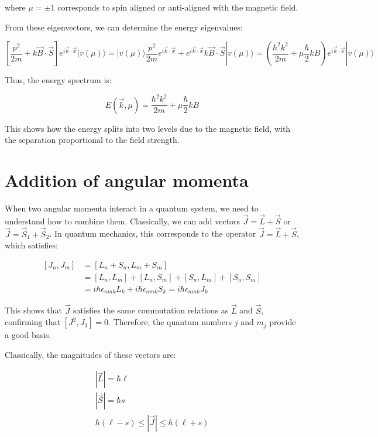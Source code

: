 where $\mu = \pm 1$ corresponds to spin aligned or anti-aligned with the magnetic field.


From these eigenvectors, we can determine the energy eigenvalues:

\begin{equation}
\left[\frac{p^{2}}{2 m}+k \vec{B} \cdot \vec{S}\right] e^{i \vec{k} \cdot \vec{x}}|v(\mu)\rangle=|v(\mu)\rangle \frac{p^{2}}{2 m} e^{i \vec{k} \cdot \vec{x}}+e^{i \vec{k} \cdot \vec{x}} k \vec{B} \cdot \vec{S}|v(\mu)\rangle=\left(\frac{\hbar^{2} k^{2}}{2 m}+\mu \frac{\hbar}{2} k B\right) e^{i \vec{k} \cdot \vec{x}}|v(\mu)\rangle
\end{equation}

Thus, the energy spectrum is:

\begin{equation}
E(\vec{k}, \mu)=\frac{\hbar^{2} k^{2}}{2 m}+\mu \frac{\hbar}{2} k B
\end{equation}

This shows how the energy splits into two levels due to the magnetic field, with the separation proportional to the field strength.

\section{Addition of angular momenta}
When two angular momenta interact in a quantum system, we need to understand how to combine them. Classically, we can add vectors $\vec{J}=\vec{L}+\vec{S}$ or $\vec{J}=\vec{S}_1+\vec{S}_2$. In quantum mechanics, this corresponds to the operator $\vec{J}=\vec{L}+\vec{S}$, which satisfies:

\begin{align}
\left[J_{n}, J_{m}\right] &= \left[L_{n}+S_{n}, L_{m}+S_{m}\right]\\
&= \left[L_{n}, L_{m}\right]+\left[L_{n}, S_{m}\right]+\left[S_{n}, L_{m}\right]+\left[S_{n}, S_{m}\right]\\
&= i \hbar \epsilon_{n m k} L_{k}+i \hbar \epsilon_{n m k} S_{k}=i \hbar \epsilon_{n m k} J_{k}
\end{align}

This shows that $\vec{J}$ satisfies the same commutation relations as $\vec{L}$ and $\vec{S}$, confirming that $\left[J^{2}, J_{3}\right]=0$. Therefore, the quantum numbers $j$ and $m_j$ provide a good basis.

Classically, the magnitudes of these vectors are:

\[
\begin{array}{r}
|\vec{L}|=\hbar \ell \\
|\vec{S}|=\hbar s  \\
\hbar(\ell-s) \leq|\vec{J}| \leq \hbar(\ell+s)
\end{array}
\]

